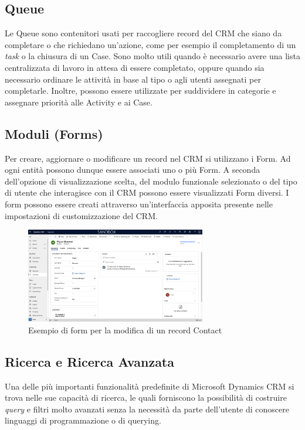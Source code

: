 \subsection{Queue}
Le Queue sono contenitori usati per raccogliere record del CRM che siano da completare o che richiedano un'azione, come per esempio il completamento di un \textit{task} o la chiusura di un Case.
Sono molto utili quando è necessario avere una lista centralizzata di lavoro in attesa di essere completato, oppure quando sia necessario ordinare le attività in base al tipo o agli utenti assegnati per completarle.
Inoltre, possono essere utilizzate per suddividere in categorie e assegnare priorità alle Activity e ai Case. \cite{Queues}

\subsection{Moduli (Forms)}
Per creare, aggiornare o modificare un record nel CRM si utilizzano i Form. Ad ogni entità possono dunque essere associati uno o più Form. A seconda dell'opzione di visualizzazione scelta, del modulo funzionale selezionato o del tipo di utente che interagisce con il CRM possono essere visualizzati Form diversi. 
I form possono essere creati attraverso un'interfaccia apposita presente nelle impostazioni di customizzazione del CRM.
\begin{figure}[ht!]
  \centering
  \includegraphics[width=0.7\textwidth]{form-example.png}
  \caption{Esempio di form per la modifica di un record Contact}
  \label{fig:formExample}
\end{figure}

\subsection{Ricerca e Ricerca Avanzata}
Una delle più importanti funzionalità predefinite di Microsoft Dynamics CRM si trova nelle sue capacità di ricerca, le quali forniscono la possibilità di costruire \textit{query} e filtri molto avanzati senza la necessità da parte dell'utente di conoscere linguaggi di programmazione o di querying.

